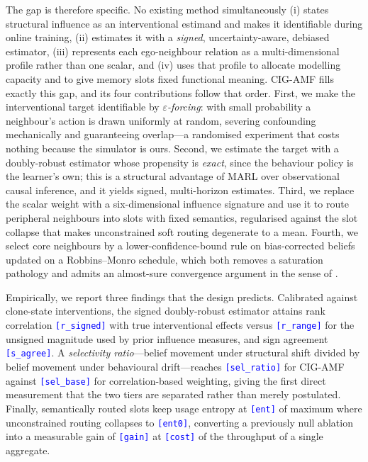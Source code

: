 \documentclass[conference]{IEEEtran}
\newcommand{\NUM}[1]{\textcolor{blue}{\texttt{[#1]}}}
\begin{document}
The gap is therefore specific. No existing method simultaneously (i) states structural influence as an interventional estimand and makes it identifiable during online training, (ii) estimates it with a \emph{signed}, uncertainty-aware, debiased estimator, (iii) represents each ego-neighbour relation as a multi-dimensional profile rather than one scalar, and (iv) uses that profile to allocate modelling capacity and to give memory slots fixed functional meaning. CIG-AMF fills exactly this gap, and its four contributions follow that order. First, we make the interventional target identifiable by \emph{$\varepsilon$-forcing}: with small probability a neighbour's action is drawn uniformly at random, severing confounding mechanically and guaranteeing overlap---a randomised experiment that costs nothing because the simulator is ours. Second, we estimate the target with a doubly-robust estimator whose propensity is \emph{exact}, since the behaviour policy is the learner's own; this is a structural advantage of MARL over observational causal inference, and it yields signed, multi-horizon estimates. Third, we replace the scalar weight with a six-dimensional influence signature and use it to route peripheral neighbours into slots with fixed semantics, regularised against the slot collapse that makes unconstrained soft routing degenerate to a mean. Fourth, we select core neighbours by a lower-confidence-bound rule on bias-corrected beliefs updated on a Robbins--Monro schedule, which both removes a saturation pathology and admits an almost-sure convergence argument in the sense of \cite{borkar2008sa, pieroth2024influence}.

Empirically, we report three findings that the design predicts. Calibrated against clone-state interventions, the signed doubly-robust estimator attains rank correlation \NUM{r\_signed} with true interventional effects versus \NUM{r\_range} for the unsigned magnitude used by prior influence measures, and sign agreement \NUM{s\_agree}. A \emph{selectivity ratio}---belief movement under structural shift divided by belief movement under behavioural drift---reaches \NUM{sel\_ratio} for CIG-AMF against \NUM{sel\_base} for correlation-based weighting, giving the first direct measurement that the two tiers are separated rather than merely postulated. Finally, semantically routed slots keep usage entropy at \NUM{ent} of maximum where unconstrained routing collapses to \NUM{ent0}, converting a previously null ablation into a measurable gain of \NUM{gain} at \NUM{cost} of the throughput of a single aggregate.
\end{document}
